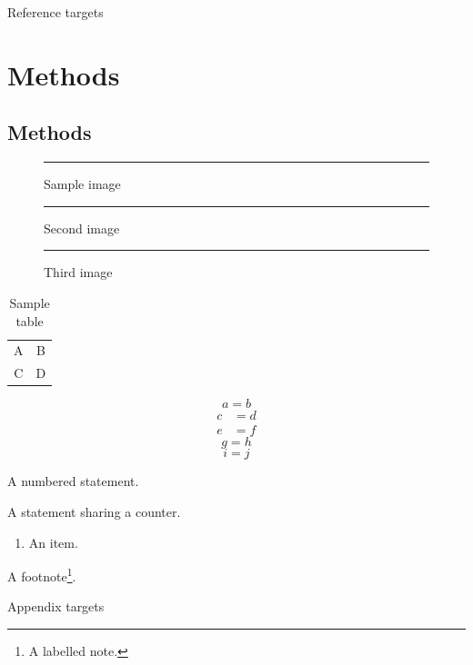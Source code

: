
\ifdefined\WiseBeamer\begin{frame}[allowframebreaks]{Reference targets}\fi
\ifdefined\WiseChapter\chapter{Methods}\label{chapter-target}\fi
\section{Methods}\label{topic}
\begin{figure}[htbp]
  \centering\rule{20mm}{3mm}
  \caption{Sample image}\label{picture}
\end{figure}
\begin{figure}[htbp]
  \centering\rule{20mm}{3mm}
  \caption{Second image}\label{picture-b}
\end{figure}
\begin{figure}[htbp]\rule{20mm}{3mm}\caption{Third image}\label{picture-c}\end{figure}
\begin{table}[htbp]
  \centering\begin{tabular}{cc}A&B\\C&D\end{tabular}
  \caption{Sample table}\label{result}
\end{table}
\begin{equation}a=b\label{balance}\end{equation}
\begin{align}c&=d\label{line-a}\\e&=f\label{line-b}\end{align}
\begin{equation}g=h\tag{S}\label{tagged}\end{equation}
\begin{equation}i=j\tag*{S}\label{bare-tagged}\end{equation}
\begin{wisethm}\label{statement}A numbered statement.\end{wisethm}
\begin{wiselemma}\label{shared}A statement sharing a counter.\end{wiselemma}
\begin{enumerate}\item An item.\label{item}\end{enumerate}
A footnote\footnote{A labelled note.\label{note}}.
\ifdefined\WiseBeamer\end{frame}\begin{frame}{Appendix targets}\fi

\end{frame}
